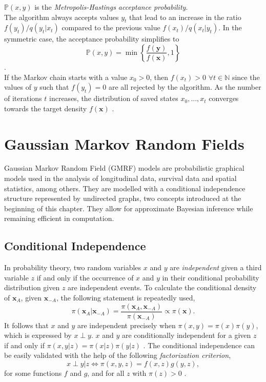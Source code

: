$\mathbb{P}\left(x,y\right)$ is the \textit{Metropolis-Hastings acceptance probability}. \\
The algorithm always accepts values $y_t$ that lead to an increase in the ratio $f\left(y_t\right)/q\left(y_t|x_t\right)$ compared to the previous value $f\left(x_t\right)/q\left(x_t|y_t\right)$. In the symmetric case, the acceptance probability simplifies to
\begin{equation*}
     \mathbb{P}\left(x,y\right) = \min\left\lbrace\frac{f\left(\pmb{y}\right)}{f\left(\pmb{x}\right)}, 1\right\rbrace
\end{equation*}
\autocite[][]{hastings1970monte}. \\
If the Markov chain starts with a value $x_0 > 0$, then $f\left(x_t\right) > 0\,\,\forall t\in\mathbb{N}$ since the values of $y$ such that $f\left(y_t\right) = 0$ are all rejected by the algorithm. As the number of iterations $t$ increases, the distribution of saved states $x_0,...,x_t$ converges towards the target density $f(\pmb{x})$ \autocite[][270--275]{robert2013monte}.
\clearpage
\section{Gaussian Markov Random Fields}
Gaussian Markov Random Field (GMRF) models are probabilistic graphical models used in the analysis of longitudinal data, survival data and spatial statistics, among others. They are modelled with a conditional independence structure represented by undirected graphs, two concepts introduced at the beginning of this chapter. They allow for approximate Bayesian inference while remaining efficient in computation.
\subsection{Conditional Independence}
In probability theory, two random variables $x$ and $y$ are \textit{independent} given a third variable $z$ if and only if the occurrence of $x$ and $y$ in their conditional probability distribution given $z$ are independent events. To calculate the conditional density of $\pmb{x}_A$, given $\pmb{x}_{-A}$, the following statement is repeatedly used,
\begin{equation}
    \pi\left(\pmb{x}_A|\pmb{x}_{-A}\right)=\frac{\pi\left(\pmb{x}_A,\pmb{x}_{-A}\right)}{\pi\left(\pmb{x}_{-A}\right)}\propto \pi\left(\pmb{x}\right).
\end{equation}
It follows that $x$ and $y$ are independent precisely when $\pi\left(x,y\right)=\pi\left(x\right)\pi\left(y\right)$, which is expressed by $x\perp y$. $x$ and $y$ are conditionally independent for a given $z$ if and only if $\pi\left(x,y|z\right)=\pi\left(x|z\right)\pi\left(y|z\right)$ \autocite[][]{dawid1979conditional}. The conditional independence can be easily validated with the help of the following \textit{factorization criterion},
\begin{equation}
    x\perp y|z\Longleftrightarrow \pi\left(x,y,z\right)=f\left(x,z\right)g\left(y,z\right),
\end{equation}
for some functions $f$ and $g$, and for all $z$ with $\pi\left(z\right) >0$ \autocite[][16--17]{rue2005gaussian}.
